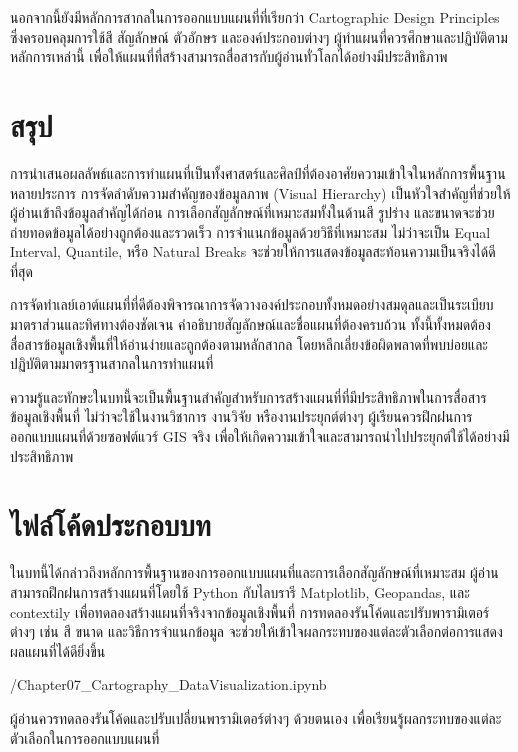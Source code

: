 นอกจากนี้ยังมีหลักการสากลในการออกแบบแผนที่ที่เรียกว่า Cartographic Design Principles ซึ่งครอบคลุมการใช้สี สัญลักษณ์ ตัวอักษร และองค์ประกอบต่างๆ ผู้ทำแผนที่ควรศึกษาและปฏิบัติตามหลักการเหล่านี้ เพื่อให้แผนที่ที่สร้างสามารถสื่อสารกับผู้อ่านทั่วโลกได้อย่างมีประสิทธิภาพ

\section{สรุป}
การนำเสนอผลลัพธ์และการทำแผนที่เป็นทั้งศาสตร์และศิลป์ที่ต้องอาศัยความเข้าใจในหลักการพื้นฐานหลายประการ การจัดลำดับความสำคัญของข้อมูลภาพ (Visual Hierarchy) เป็นหัวใจสำคัญที่ช่วยให้ผู้อ่านเข้าถึงข้อมูลสำคัญได้ก่อน การเลือกสัญลักษณ์ที่เหมาะสมทั้งในด้านสี รูปร่าง และขนาดจะช่วยถ่ายทอดข้อมูลได้อย่างถูกต้องและรวดเร็ว การจำแนกข้อมูลด้วยวิธีที่เหมาะสม ไม่ว่าจะเป็น Equal Interval, Quantile, หรือ Natural Breaks จะช่วยให้การแสดงข้อมูลสะท้อนความเป็นจริงได้ดีที่สุด

การจัดทำเลย์เอาต์แผนที่ที่ดีต้องพิจารณาการจัดวางองค์ประกอบทั้งหมดอย่างสมดุลและเป็นระเบียบ มาตราส่วนและทิศทางต้องชัดเจน คำอธิบายสัญลักษณ์และชื่อแผนที่ต้องครบถ้วน ทั้งนี้ทั้งหมดต้องสื่อสารข้อมูลเชิงพื้นที่ให้อ่านง่ายและถูกต้องตามหลักสากล โดยหลีกเลี่ยงข้อผิดพลาดที่พบบ่อยและปฏิบัติตามมาตรฐานสากลในการทำแผนที่

ความรู้และทักษะในบทนี้จะเป็นพื้นฐานสำคัญสำหรับการสร้างแผนที่ที่มีประสิทธิภาพในการสื่อสารข้อมูลเชิงพื้นที่ ไม่ว่าจะใช้ในงานวิชาการ งานวิจัย หรืองานประยุกต์ต่างๆ ผู้เรียนควรฝึกฝนการออกแบบแผนที่ด้วยซอฟต์แวร์ GIS จริง เพื่อให้เกิดความเข้าใจและสามารถนำไปประยุกต์ใช้ได้อย่างมีประสิทธิภาพ

\section{ไฟล์โค้ดประกอบบท}
ในบทนี้ได้กล่าวถึงหลักการพื้นฐานของการออกแบบแผนที่และการเลือกสัญลักษณ์ที่เหมาะสม ผู้อ่านสามารถฝึกฝนการสร้างแผนที่โดยใช้ Python กับไลบรารี Matplotlib, Geopandas, และ contextily เพื่อทดลองสร้างแผนที่จริงจากข้อมูลเชิงพื้นที่ การทดลองรันโค้ดและปรับพารามิเตอร์ต่างๆ เช่น สี ขนาด และวิธีการจำแนกข้อมูล จะช่วยให้เข้าใจผลกระทบของแต่ละตัวเลือกต่อการแสดงผลแผนที่ได้ดียิ่งขึ้น

\notebooks/Chapter07_Cartography\_DataVisualization.ipynb

ผู้อ่านควรทดลองรันโค้ดและปรับเปลี่ยนพารามิเตอร์ต่างๆ ด้วยตนเอง เพื่อเรียนรู้ผลกระทบของแต่ละตัวเลือกในการออกแบบแผนที่

